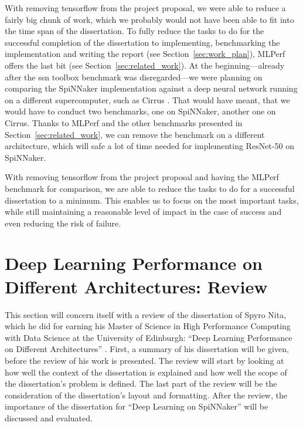 \documentclass{article}
\begin{document}
With removing tensorflow from the project proposal, we
were able to reduce a fairly big chunk of work, which we
probably would not have been able to fit into the time
span of the dissertation.
To fully reduce the tasks to do for the successful
completion of the dissertation to implementing,
benchmarking the implementation and writing the report
(see Section~\ref{sec:work_plan}), MLPerf offers the last
bit (see Section~\ref{sec:related_work}).
At the beginning---already after the ssn toolbox benchmark
was disregarded---we were planning on comparing the
SpiNNaker implementation against a deep neural network
running on a different supercomputer, such as Cirrus
\citep{cirrus}.
That would have meant, that we would have to conduct two
benchmarks, one on SpiNNaker, another one on Cirrus.
Thanks to MLPerf and the other benchmarks presented in
Section~\ref{sec:related_work}, we can remove the
benchmark on a different architecture, which will safe
a lot of time needed for implementing ResNet-50 on
SpiNNaker.

With removing tensorflow from the project proposal and
having the MLPerf benchmark for comparison, we are able
to reduce the tasks to do for a successful dissertation to
a minimum.
This enables us to focus on the most important tasks, while
still maintaining a reasonable level of impact in the case
of success and even reducing the risk of failure.


\section{Deep Learning Performance on Different %
  Architectures: Review}
\label{sec:review}

This section will concern itself with a review of the
dissertation of Spyro Nita, which he did for earning his
Master of Science in High Performance Computing with Data
Science at the University of Edinburgh:
``Deep Learning Performance on Different Architectures''
 \citep{nita_2018}.
First, a summary of his dissertation will be given, before
the review of his work is presented.
The review will start by looking at how well the context
of the dissertation is explained and how well the scope
of the dissertation's problem is defined.
The last part of the review will be the consideration of
the dissertation's layout and formatting.
After the review, the importance of the dissertation for
``Deep Learning on SpiNNaker'' will be discussed and
evaluated.
\end{document}
